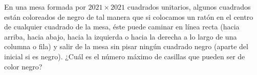 En una mesa formada por $2021\times 2021$ cuadrados unitarios, algunos cuadrados están coloreados de negro de tal manera que si colocamos un ratón en el centro de cualquier cuadrado de la mesa, éste puede caminar en línea recta (hacia arriba, hacia abajo, hacia la izquierda o hacia la derecha a lo largo de una columna o fila) y salir de la mesa sin pisar ningún cuadrado negro (aparte del inicial si es negro). ¿Cuál es el número máximo de casillas que pueden ser de color negro?
